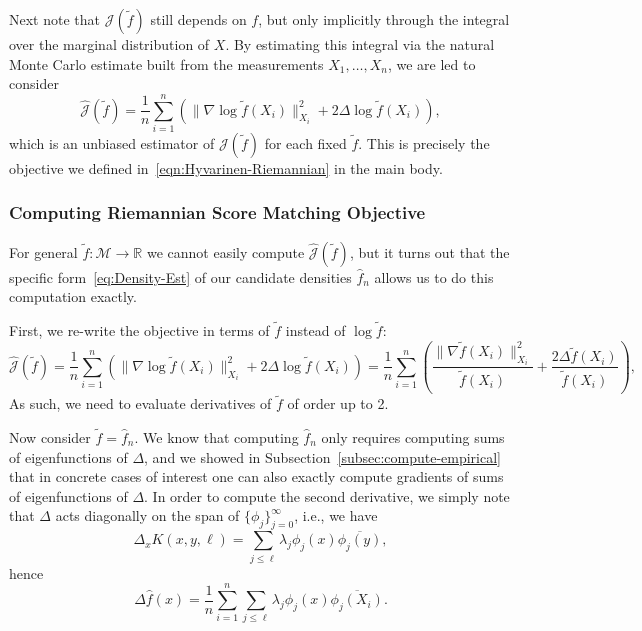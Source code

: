 \documentclass[preprint]{imsart}
\theoremstyle{plain}
\theoremstyle{definition}
\newcommand{\Rbb}{\mathbb{R}}
\newcommand{\Mcal}{\mathcal{M}}
\begin{document}
\begin{appendix}
Next note that $\mathcal{J}(\tilde{f})$ still depends on $f$, but only implicitly through the integral over the marginal distribution of $X$.
By estimating this integral via the natural Monte Carlo estimate built from the measurements $X_1,\ldots, X_n$, we are led to consider
\begin{equation*}
    \hat{\mathcal{J}}(\tilde{f}) =
    \frac{1}{n}\sum_{i=1}^n \left(\|\nabla \log \tilde{f}(X_i)\|_{X_i}^2 + 2\Delta \log \tilde{f}(X_i)\right),
\end{equation*}
which is an unbiased estimator of $\mathcal{J}(\tilde{f})$ for each fixed $\tilde{f}$. 
This is precisely the objective we defined in~\eqref{eqn:Hyvarinen-Riemannian} in the main body.


\subsubsection{Computing Riemannian Score Matching Objective}

For general $\tilde{f}:\Mcal\to\Rbb$ we cannot easily compute $\hat{\mathcal{J}}(\tilde{f})$, but it turns out that the specific form~\eqref{eq:Density-Est} of our candidate densities $\hat{f}_n$ allows us to do this computation exactly.

First, we re-write the objective in terms of $\tilde{f}$ instead of $\log\tilde{f}$:
\begin{equation*}
    \hat{\mathcal{J}}(\tilde{f}) =
    \frac{1}{n}\sum_{i=1}^n \left(\|\nabla \log \tilde{f}(X_i)\|_{X_i}^2 + 2\Delta \log \tilde{f}(X_i)\right)=
    \frac{1}{n}\sum_{i=1}^n \left(\frac{\|\nabla \tilde{f}(X_i)\|_{X_i}^2}{\tilde{f}(X_i)} + \frac{2\Delta \tilde{f}(X_i)}{\tilde{f}(X_i)}\right),
\end{equation*}
As such, we need to evaluate derivatives of $\tilde{f}$ of order up to 2.

Now consider $\tilde{f}=\hat{f}_n$.
We know that computing $\hat{f}_n$ only requires computing sums of eigenfunctions of $\Delta$, and we showed in Subsection~\ref{subsec:compute-empirical} that in concrete cases of interest one can also exactly compute gradients of sums of eigenfunctions of $\Delta$.
In order to compute the second derivative, we simply note that $\Delta$ acts diagonally on the span of $\{\phi_j\}_{j=0}^{\infty}$, i.e., we have
\[
\Delta_x K(x,y,\ell)
=
\sum_{j\le \ell} \lambda_j \phi_j(x)\overline{\phi_j(y)},
\]
hence\[
\Delta \hat f(x)
=
\frac{1}{n}
\sum_{i=1}^n
\sum_{j\le \ell}
\lambda_j \phi_j(x)\overline{\phi_j(X_i)}.
\]


\end{appendix}
\end{document}
